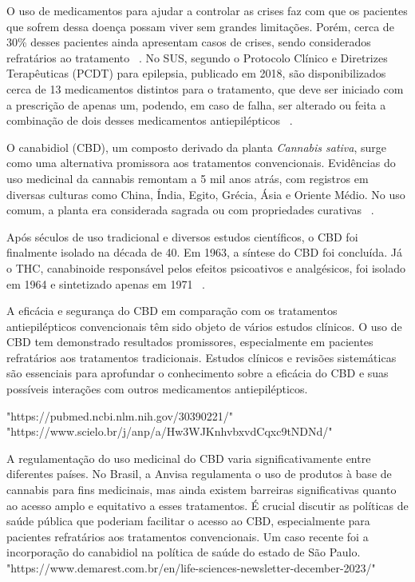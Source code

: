 \documentclass[article,a4paper,12pt,brazil,sumario=tradicional]{abntex2}
\begin{document}
O uso de medicamentos para ajudar a controlar as crises faz com que os pacientes que sofrem dessa doença possam viver sem grandes limitações. Porém, cerca de 30\% desses pacientes ainda apresentam casos de crises, sendo considerados refratários ao tratamento ~\cite{relatorioSociedadeConitec}. No SUS, segundo o Protocolo Clínico e Diretrizes Terapêuticas (PCDT) para epilepsia, publicado em 2018, são disponibilizados cerca de 13 medicamentos distintos para o tratamento, que deve ser iniciado com a prescrição de apenas um, podendo, em caso de falha, ser alterado ou feita a combinação de dois desses medicamentos antiepilépticos ~\cite{relatorioSociedadeConitec}.

O canabidiol (CBD), um composto derivado da planta \textit{Cannabis sativa}, surge como uma alternativa promissora aos tratamentos convencionais. Evidências do uso medicinal da cannabis remontam a 5 mil anos atrás, com registros em diversas culturas como China, Índia, Egito, Grécia, Ásia e Oriente Médio. No uso comum, a planta era considerada sagrada ou com propriedades curativas ~\cite{cannabis12000anos}.

Após séculos de uso tradicional e diversos estudos científicos, o CBD foi finalmente isolado na década de 40. Em 1963, a síntese do CBD foi concluída. Já o THC, canabinoide responsável pelos efeitos psicoativos e analgésicos, foi isolado em 1964 e sintetizado apenas em 1971 ~\cite{cannabis12000anos}.

A eficácia e segurança do CBD em comparação com os tratamentos antiepilépticos convencionais têm sido objeto de vários estudos clínicos. O uso de CBD tem demonstrado resultados promissores, especialmente em pacientes refratários aos tratamentos tradicionais. Estudos clínicos e revisões sistemáticas são essenciais para aprofundar o conhecimento sobre a eficácia do CBD e suas possíveis interações com outros medicamentos antiepilépticos.

"https://pubmed.ncbi.nlm.nih.gov/30390221/"
"https://www.scielo.br/j/anp/a/Hw3WJKnhvbxvdCqxc9tNDNd/"

A regulamentação do uso medicinal do CBD varia significativamente entre diferentes países. No Brasil, a Anvisa regulamenta o uso de produtos à base de cannabis para fins medicinais, mas ainda existem barreiras significativas quanto ao acesso amplo e equitativo a esses tratamentos. É crucial discutir as políticas de saúde pública que poderiam facilitar o acesso ao CBD, especialmente para pacientes refratários aos tratamentos convencionais. Um caso recente foi a incorporação do canabidiol na política de saúde do estado de São Paulo.
"https://www.demarest.com.br/en/life-sciences-newsletter-december-2023/"
\end{document}
